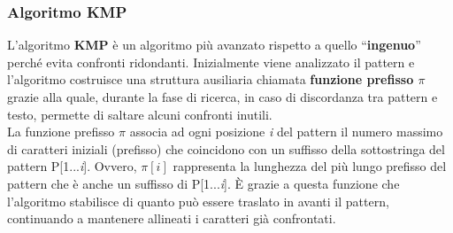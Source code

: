 \documentclass{article}
\begin{document}
\subsubsection{Algoritmo KMP}
L'algoritmo \textbf{KMP} è un algoritmo più avanzato rispetto a quello ``\textbf{ingenuo}'' perché evita confronti ridondanti. Inizialmente viene analizzato il pattern e l'algoritmo costruisce una struttura ausiliaria chiamata \textbf{funzione prefisso $\pi$} grazie alla quale, durante la fase di ricerca, in caso di discordanza tra pattern e testo, permette di saltare alcuni confronti inutili.\\
La funzione prefisso $\pi$ associa ad ogni posizione \textit{i} del pattern il numero massimo di caratteri iniziali (prefisso) che coincidono con un suffisso della sottostringa del pattern P[1...\textit{i}]. Ovvero, $\pi[i]$ rappresenta la lunghezza del più lungo prefisso del pattern che è anche un suffisso di P[1...\textit{i}]. È grazie a questa funzione che l'algoritmo stabilisce di quanto può essere traslato in avanti il pattern, continuando a mantenere allineati i caratteri già confrontati.
\end{document}
